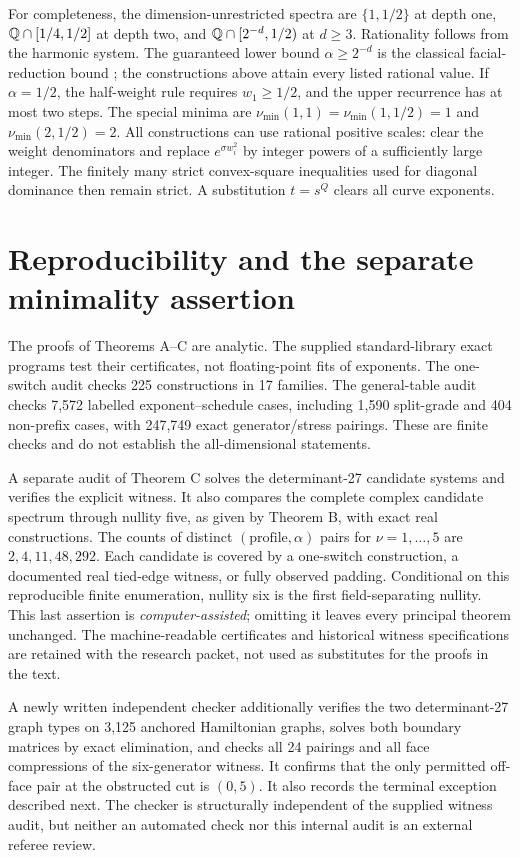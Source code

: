 For completeness, the dimension-unrestricted spectra are $\{1,1/2\}$ at depth one, $\mathbb Q\cap[1/4,1/2]$ at depth two, and $\mathbb Q\cap[2^{-d},1/2)$ at $d\ge3$. Rationality follows from the harmonic system. The guaranteed lower bound $\alpha\ge2^{-d}$ is the classical facial-reduction bound \cite{Sturm00,Lourenco21}; the constructions above attain every listed rational value. If $\alpha=1/2$, the half-weight rule requires $w_1\ge1/2$, and the upper recurrence has at most two steps. The special minima are $\nu_{\min}(1,1)=\nu_{\min}(1,1/2)=1$ and $\nu_{\min}(2,1/2)=2$. All constructions can use rational positive scales: clear the weight denominators and replace $e^{\sigma w_i^2}$ by integer powers of a sufficiently large integer. The finitely many strict convex-square inequalities used for diagonal dominance then remain strict. A substitution $t=s^Q$ clears all curve exponents.

\section{Reproducibility and the separate minimality assertion}\label{app:computation}
The proofs of Theorems A--C are analytic. The supplied standard-library exact programs test their certificates, not floating-point fits of exponents. The one-switch audit checks 225 constructions in 17 families. The general-table audit checks 7,572 labelled exponent--schedule cases, including 1,590 split-grade and 404 non-prefix cases, with 247,749 exact generator/stress pairings. These are finite checks and do not establish the all-dimensional statements.

A separate audit of Theorem C solves the determinant-27 candidate systems and verifies the explicit witness. It also compares the complete complex candidate spectrum through nullity five, as given by Theorem B, with exact real constructions. The counts of distinct $(\text{profile},\alpha)$ pairs for $\nu=1,\ldots,5$ are $2,4,11,48,292$. Each candidate is covered by a one-switch construction, a documented real tied-edge witness, or fully observed padding. Conditional on this reproducible finite enumeration, nullity six is the first field-separating nullity. This last assertion is \emph{computer-assisted}; omitting it leaves every principal theorem unchanged. The machine-readable certificates and historical witness specifications are retained with the research packet, not used as substitutes for the proofs in the text.

A newly written independent checker additionally verifies the two determinant-27 graph types on 3,125 anchored Hamiltonian graphs, solves both boundary matrices by exact elimination, and checks all 24 pairings and all face compressions of the six-generator witness. It confirms that the only permitted off-face pair at the obstructed cut is $(0,5)$. It also records the terminal exception described next. The checker is structurally independent of the supplied witness audit, but neither an automated check nor this internal audit is an external referee review.

